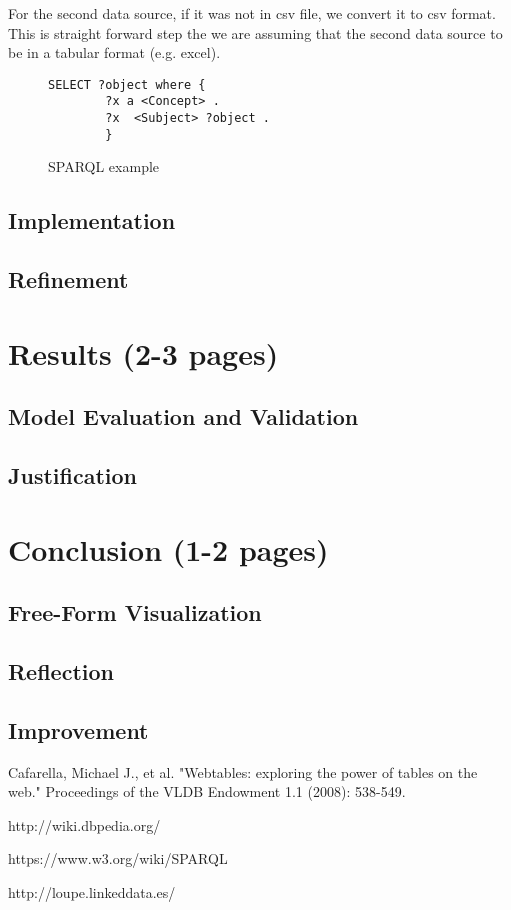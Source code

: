 \documentclass{article}
\begin{document}
For the second data source, if it was not in csv file, we convert it to csv format. This is straight forward step the we are assuming that the second data source to be in a tabular format (e.g. excel).
 



\begin{figure}
  \caption{SPARQL example}
  \label{fig:sparql}
\begin{lstlisting}[language=SPARQL]
SELECT ?object where {
        ?x a <Concept> .
        ?x  <Subject> ?object .
        }
\end{lstlisting}
\end{figure}


\subsection{Implementation}
\subsection{Refinement}


\section{Results (2-3 pages)}
\subsection{Model Evaluation and Validation}
\subsection{Justification}

\section{Conclusion (1-2 pages)}
 \subsection{Free-Form Visualization}
 \subsection{Reflection}
 \subsection{Improvement}
 
 
\begin{thebibliography}{99}
Cafarella, Michael J., et al. "Webtables: exploring the power of tables on the web." Proceedings of the VLDB Endowment 1.1 (2008): 538-549.

http://wiki.dbpedia.org/

https://www.w3.org/wiki/SPARQL

http://loupe.linkeddata.es/
\end{thebibliography}
 
 
\end{document}
